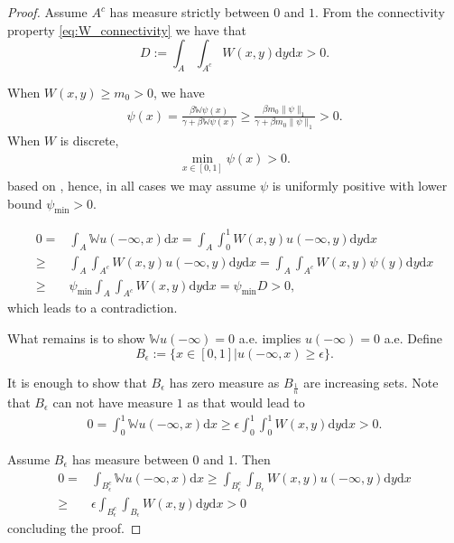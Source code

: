 \documentclass{article}
\renewcommand{\d}{\mathrm{d}}
\newcommand{\W}{\mathbb{W}}
\newcommand{\1}[1]{{\mathds{1}}_{\left\{#1\right\}}}
\begin{document}
\begin{proof}
	Assume $A^c$ has measure strictly between $0$ and $1$. From the connectivity property \eqref{eq:W_connectivity} we have that
	$$D:=\int_{A} \int_{A^c}W(x,y) \d y \d x>0. $$
	
	When $W(x,y) \geq m_0>0$, we have
	\begin{align*}
		\psi(x)=\frac{\beta \W \psi(x)}{\gamma+\beta \W \psi(x)} \geq \frac{\beta m_0 \|\psi \|_1}{\gamma+\beta m_0 \|\psi\|_1 }>0.
	\end{align*}
	When $W$ is discrete,
	\begin{align*}
		\min_{x \in [0,1]}\psi(x)>0.
	\end{align*}
	based on \cite{NIMFA_bifurcation}, hence, in all cases we may assume $\psi$ is uniformly positive with lower bound $\psi_{\min}>0.$
	
	
	\begin{align*}
		0=&\int_{A} \W u(-\infty, x) \d x=\int_{A}\int_{0}^{1} W(x,y) u(-\infty,y) \d y \d x  \\
		\geq & \int_{A}\int_{A^c} W(x,y) u(-\infty,y) \d y \d x=\int_{A}\int_{A^c} W(x,y) \psi(y) \d y \d x \\
		\geq& \psi_{\min}  \int_{A}\int_{A^c} W(x,y)   \d y \d x = \psi_{\min} D>0,
	\end{align*}
	which leads to a contradiction.
	
	What remains is to show $\W u(-\infty)=0$ a.e. implies $u(-\infty)=0$ a.e. Define
	$$B_{\epsilon}:=\{ x \in [0,1] \left| u(-\infty,x) \geq \epsilon \right.\}. $$
	
	It is enough to show that $B_{\epsilon}$ has zero measure as $B_{\frac{1}{n}}$ are increasing sets. Note that $B_{\epsilon}$ can not have measure $1$ as that would lead to
	\begin{align*}
		0=\int_{0}^{1} \W u(-\infty,x) \d x \geq \epsilon \int_{0}^{1}\int_{0}^{1}W(x,y) \d y \d x>0.
	\end{align*}
	
	Assume $B_{\epsilon}$ has measure between $0$ and $1$. Then
	\begin{align*}
		0=&\int_{B_{\epsilon}^c} \W u(-\infty,x) \d x \geq \int_{B_{\epsilon}^c}\int_{B_{\epsilon}}W(x,y) u(-\infty,y) \d y \d x\\
		\geq & \epsilon\int_{B_{\epsilon}^c}\int_{B_{\epsilon}}W(x,y)  \d y \d x >0
	\end{align*}
	concluding the proof.
\end{proof}
\end{document}
